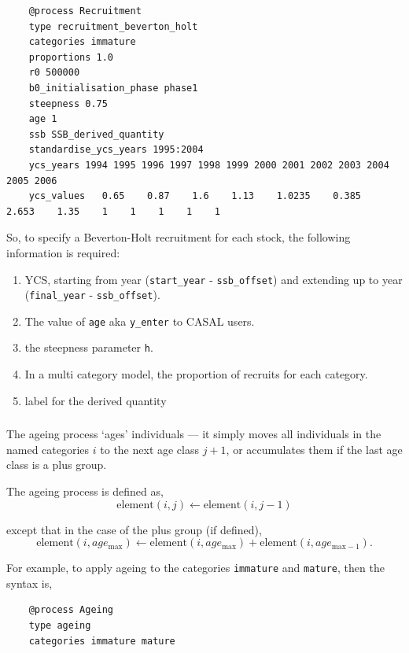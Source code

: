 {\small{\begin{verbatim}
	@process Recruitment
	type recruitment_beverton_holt
	categories immature
	proportions 1.0
	r0 500000
	b0_initialisation_phase phase1
	steepness 0.75
	age 1
	ssb SSB_derived_quantity
	standardise_ycs_years 1995:2004
	ycs_years 1994 1995 1996 1997 1998 1999 2000 2001 2002 2003 2004 2005 2006
	ycs_values   0.65    0.87    1.6    1.13    1.0235    0.385   2.653    1.35    1    1    1    1    1
\end{verbatim}}}

So, to specify a Beverton-Holt recruitment for each stock, the following information is required:
\begin{enumerate}
	\item YCS, starting from year (\texttt{start\_year} - \texttt{ssb\_offset}) and extending up to year (\texttt{final\_year} - \texttt{ssb\_offset}).
	\item The value of \texttt{age} aka \texttt{y\_enter} to CASAL users.
	\item the steepness parameter \texttt{h}.
	\item In a multi category model, the proportion of recruits for each category.
	\item label for the derived quantity
\end{enumerate}
\subsubsection{\label{sec:ageing}}

The ageing process `ages' individuals --- it simply moves all individuals in the named categories $i$ to the next age class $j + 1$, or accumulates them if the last age class is a plus group. 

The ageing process is defined as,
\begin{equation}
  \text{element}(i,j) \leftarrow \text{element}(i,j-1)
\end{equation}

except that in the case of the plus group (if defined), 
\begin{equation}
  \text{element}(i,age_{\text{max}}) \leftarrow \text{element}(i,age_{\text{max}}) + \text{element}(i,age_{\text{max}-1}).
\end{equation}

For example, to apply ageing to the categories \texttt{immature} and \texttt{mature}, then the syntax is,

{\small{\begin{verbatim}
	@process Ageing
	type ageing
	categories immature mature
	\end{verbatim}}}

